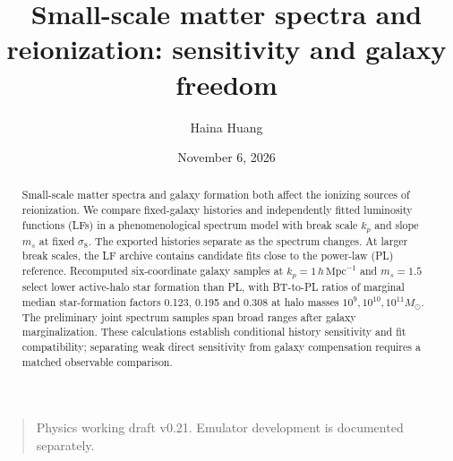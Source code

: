 \documentclass[reprint,superscriptaddress,nofootinbib,nobibnotes,amsmath,amssymb,aps,prd,floatfix,longbibliography]{revtex4-2}
\def\btemubody{body.tex}
\begin{document}
\title{Small-scale matter spectra and reionization: sensitivity and galaxy freedom}
\author{Haina Huang}
\date{November 6, 2026}
\begin{abstract}
Small-scale matter spectra and galaxy formation both affect the ionizing sources of reionization. We compare fixed-galaxy histories and independently fitted luminosity functions (LFs) in a phenomenological spectrum model with break scale $k_p$ and slope $m_s$ at fixed $\sigma_8$. The exported histories separate as the spectrum changes. At larger break scales, the LF archive contains candidate fits close to the power-law (PL) reference. Recomputed six-coordinate galaxy samples at $k_p=1\,h\,\mathrm{Mpc}^{-1}$ and $m_s=1.5$ select lower active-halo star formation than PL, with BT-to-PL ratios of marginal median star-formation factors 0.123, 0.195 and 0.308 at halo masses $10^9,10^{10},10^{11}M_\odot$. The preliminary joint spectrum samples span broad ranges after galaxy marginalization. These calculations establish conditional history sensitivity and fit compatibility; separating weak direct sensitivity from galaxy compensation requires a matched observable comparison.
\end{abstract}
\maketitle
\begin{quote}\small Physics working draft v0.21. Emulator development is documented separately.\end{quote}

\end{document}
